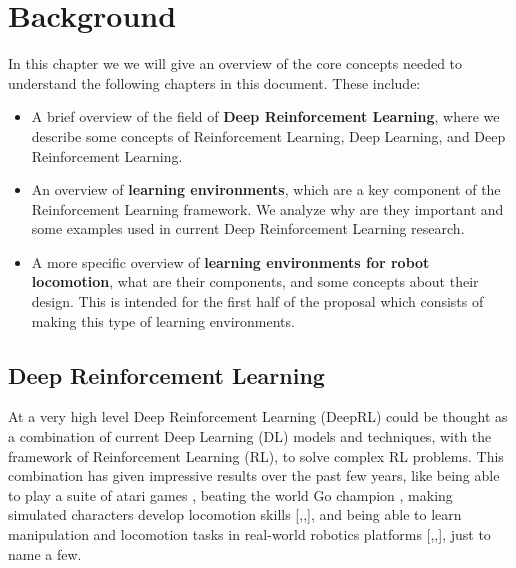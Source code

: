 \chapter{Background}
\label{ch:background}




In this chapter we we will give an overview of the core concepts needed to
understand the following chapters in this document. These include:


\begin{itemize}
    \item A brief overview of the field of \textbf{Deep Reinforcement Learning}, where
          we describe some concepts of Reinforcement Learning, Deep Learning, and Deep
          Reinforcement Learning.
    \item An overview of \textbf{learning environments}, which are a key component of
          the Reinforcement Learning framework. We analyze why are they important 
          and some examples used in current Deep Reinforcement Learning research.
    \item A more specific overview of \textbf{learning environments for robot locomotion}, 
          what are their components, and some concepts about their design. This is
          intended for the first half of the proposal which consists of making this type
          of learning environments.
\end{itemize}


\section{Deep Reinforcement Learning}

At a very high level Deep Reinforcement Learning (DeepRL) could be thought as a combination 
of current Deep Learning (DL) models and techniques, with the framework of Reinforcement 
Learning (RL), to solve complex RL problems. This combination has given impressive 
results over the past few years, like being able to play a suite of atari games \citep{DQNAtari}, 
beating the world Go champion \citep{AlphaGo}, making simulated characters develop locomotion
skills [\citeauthor{DeepmindEmergenceLocomotion},\citeauthor{DeepTerrainRL},\citeauthor{DeepMimic}], 
and being able to learn manipulation and locomotion tasks in 
real-world robotics platforms [\citeauthor{EndToEndVisuoMotorPolicies},\citeauthor{ScalableDeepRL},\citeauthor{GoogleBrainSim2Real}],
just to name a few.

